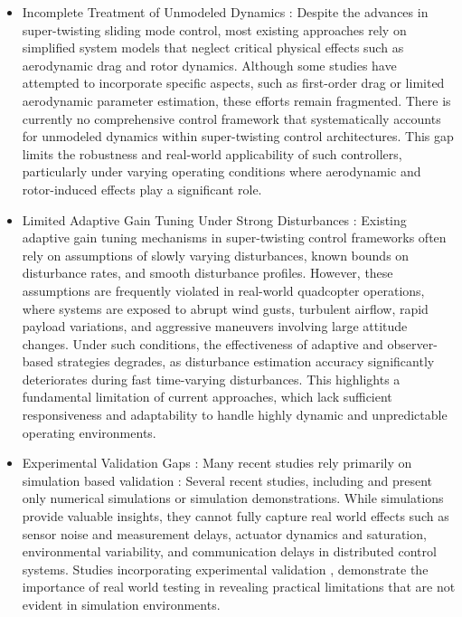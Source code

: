 \begin{itemize}
    \item  Incomplete Treatment of Unmodeled Dynamics : Despite the advances in super-twisting sliding mode control, most existing approaches rely on simplified system models that neglect critical physical effects such as aerodynamic drag and  rotor dynamics. Although some studies have attempted to incorporate specific aspects, such as first-order drag or limited aerodynamic parameter estimation, these efforts remain fragmented. There is currently no comprehensive control framework that systematically accounts for unmodeled dynamics within super-twisting control architectures. This gap limits the robustness and real-world applicability of such controllers, particularly under varying operating conditions where aerodynamic and rotor-induced effects play a significant role.

    

    \item  Limited Adaptive Gain Tuning Under Strong Disturbances : Existing adaptive gain tuning mechanisms in super-twisting control frameworks often rely on assumptions of slowly varying disturbances, known bounds on disturbance rates, and smooth disturbance profiles. However, these assumptions are frequently violated in real-world quadcopter operations, where systems are exposed to abrupt wind gusts, turbulent airflow, rapid payload variations, and aggressive maneuvers involving large attitude changes. Under such conditions, the effectiveness of adaptive and observer-based strategies degrades, as disturbance estimation accuracy significantly deteriorates during fast time-varying disturbances. This highlights a fundamental limitation of current approaches, which lack sufficient responsiveness and adaptability to handle highly dynamic and unpredictable operating environments.

    \item Experimental Validation Gaps : Many recent studies rely primarily on simulation based validation : Several recent studies, including  and  present only numerical simulations or simulation demonstrations. While simulations provide valuable insights, they cannot fully capture real world effects such as sensor noise and measurement delays, actuator dynamics and saturation, environmental variability, and communication delays in distributed control systems.
Studies incorporating experimental validation , demonstrate the importance of real world testing in revealing practical limitations that are not evident in simulation environments.


    
\end{itemize}




